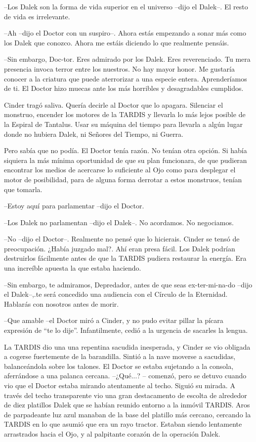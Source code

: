 --Los Dalek son la forma de vida superior en el universo --dijo el Dalek--. El resto de vida es irrelevante.

--Ah --dijo el Doctor con un suspiro--. Ahora estás empezando a sonar más como los Dalek que conozco. Ahora me estáis diciendo lo que realmente pensáis.

--Sin embargo, Doc-tor. Eres admirado por los Dalek. Eres reverenciado. Tu mera presencia invoca terror entre los nuestros. No hay mayor honor. Me gustaría conocer a la criatura que puede aterrorizar a una especie entera. Aprenderíamos de ti.
El Doctor hizo muecas ante los más horribles y desagradables cumplidos.

Cinder tragó saliva. Quería decirle al Doctor que lo apagara. Silenciar el monstruo, encender los motores de la TARDIS y llevarla lo más lejos posible de la Espiral de Tantalus. Usar su máquina del tiempo para llevarla a algún lugar donde no hubiera Dalek, ni Señores del Tiempo, ni Guerra.

Pero sabía que no podía. El Doctor tenía razón. No tenían otra opción. Si había siquiera la más mínima oportunidad de que su plan funcionara, de que pudieran encontrar los medios de acercarse lo suficiente al Ojo como para desplegar el motor de posibilidad, para de alguna forma derrotar a estos monstruos, tenían que tomarla.

--Estoy aquí para parlamentar --dijo el Doctor.

--Los Dalek no parlamentan --dijo el Dalek--. No acordamos. No negociamos.

--No --dijo el Doctor--. Realmente no pensé que lo hicierais.
Cinder se tensó de preocupación. ¿Había juzgado mal?. Ahí eran presa fácil. Los Dalek podrían destruirlos fácilmente antes de que la TARDIS pudiera restaurar la energía. Era una increíble apuesta la que estaba haciendo.

--Sin embargo, te admiramos, Depredador, antes de que seas ex-ter-mi-na-do --dijo el Dalek--,.te será concedido una audiencia con el Círculo de la Eternidad. Hablarás con nosotros antes de morir.

--Que amable --el Doctor miró a Cinder, y no pudo evitar pillar la pícara expresión de “te lo dije”. Infantilmente, cedió a la urgencia de sacarles la lengua.

La TARDIS dio una una repentina sacudida inesperada, y Cinder se vio obligada a cogerse fuertemente de la barandilla. Sintió a la nave moverse a sacudidas, balanceándola sobre los talones. El Doctor se estaba sujetando a la consola, aferrándose a una palanca cercana.
--¿Qué...? -- comenzó, pero se detuvo cuando vio que el Doctor estaba mirando atentamente al techo. Siguió su mirada. A través del techo transparente vio una gran destacamento de escolta de alrededor de diez platillos Dalek que se habían reunido entorno a la inmóvil TARDIS. Aros de parpadeante luz azul manaban de la base del platillo más cercano, cercando la TARDIS en lo que asumió que era un rayo tractor. Estaban siendo lentamente arrastrados hacia el Ojo, y al palpitante corazón de la operación Dalek.

